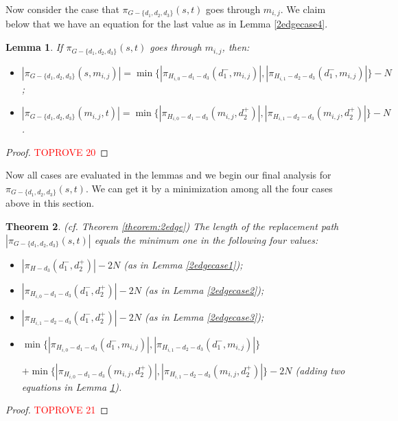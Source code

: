 \documentclass[11pt]{article}
\theoremstyle{plain}
\newtheorem{theorem}{Theorem}[section]
\newtheorem{lemma}[theorem]{Lemma}
\theoremstyle{definition}
\newcommand{\set}[1]{\{ #1 \}}
\newcommand{\og}[3]{\pi_{G-#3}\left(#1,#2\right)}
\newcommand{\hg}[3]{\pi_{H-#3}\left(#1,#2\right)}
\begin{document}
Now consider the case that $\og{s}{t}{\set{d_1, d_2, d_3}}$ goes through $m_{i,j}$. We claim below that we have an equation for the last value as in Lemma \ref{2edgecase4}.

\begin{lemma}\label{lemma:2edgescase4-2}
    If $\og{s}{t}{\set{d_1, d_2, d_3}}$ goes through $m_{i,j}$, then:
    \begin{itemize}
    \item $|\og{s}{m_{i,j}}{\set{d_1, d_2, d_3}}| = \min \{ |\pi_{H_{i,0}-d_1-d_3}(d_1^-,m_{i,j})|,|\pi_{H_{i,1}-d_2-d_3}(d_1^-,m_{i,j})| \} -N$;
    \item $|\og{m_{i,j}}{t}{\set{d_1, d_2, d_3}}| = \min \{ |\pi_{H_{i,0}-d_1-d_3}(m_{i,j},d_2^+)|,|\pi_{H_{i,1}-d_2-d_3}(m_{i,j},d_2^+)| \} -N$.
\end{itemize}
\end{lemma}


\begin{proof}\textcolor{red}{TOPROVE 20}\end{proof}



Now all cases are evaluated in the lemmas and we begin our final analysis for $\og{s}{t}{\set{d_1, d_2, d_3}}$. We can get it by a minimization among all the four cases above in this section.

\begin{theorem}(cf. Theorem \ref{theorem:2edge})
The length of the replacement path $|\og{s}{t}{\set{d_1, d_2, d_3}}|$ equals the minimum one in the following four values:
\begin{itemize}
    \item $|\hg{d_1^-}{d_2^+}{d_3}|-2N$ (as in Lemma \ref{2edgecase1});
    \item $|\pi_{H_{i,0}-d_1-d_3}(d_1^-,d_2^+)|-2N$ (as in Lemma \ref{2edgecase2});
    \item $|\pi_{H_{i,1}-d_2-d_3}(d_1^-,d_2^+)|-2N$ (as in Lemma \ref{2edgecase3});
    \item $\min \{ |\pi_{H_{i,0}-d_1-d_3}(d_1^-,m_{i,j})|,|\pi_{H_{i,1}-d_2-d_3}(d_1^-,m_{i,j})| \}$ 
    
    $+ \min \{ |\pi_{H_{i,0}-d_1-d_3}(m_{i,j},d_2^+)|,|\pi_{H_{i,1}-d_2-d_3}(m_{i,j},d_2^+)| \} -2N$ (adding two equations in Lemma \ref{lemma:2edgescase4-2}).
\end{itemize}
\end{theorem}

\begin{proof}\textcolor{red}{TOPROVE 21}\end{proof}
\end{document}
